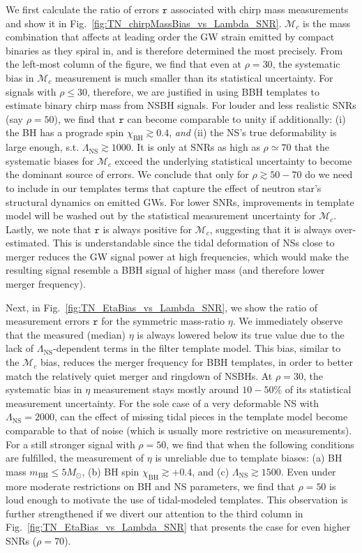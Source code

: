 \documentclass[aps,prd,amsmath,floats,floatfix, twocolumn,
superscriptaddress,nofootinbib,showpacs]{revtex4-1}
\newcommand{\lambdans}{\Lambda_\mathrm{NS}}
\newcommand{\chibh}{\chi_\mathrm{BH}}
\newcommand{\mbh}{m_\mathrm{BH}}
\newcommand{\mchirp}{\mathcal{M}_c}
\newcommand{\arr}{\mathtt{r}}
\begin{document}
We first calculate the ratio of errors $\arr$ associated with chirp mass measurements
and show it in
Fig.~\ref{fig:TN_chirpMassBias_vs_Lambda_SNR}. $\mchirp$ is the mass combination
that affects at leading order the GW strain emitted
by compact binaries as they spiral in, and is therefore determined the most
precisely. From the left-most column of the figure, we find that even at $\rho=30$, 
the systematic bias in $\mchirp$ measurement is much smaller than its statistical
uncertainty. For signals with $\rho\leq 30$, therefore, we are justified in using
BBH templates to estimate binary chirp mass from NSBH signals. For louder and less
realistic SNRs (say $\rho=50$), we find that $\arr$ can become comparable to unity
if additionally: (i) the BH has a prograde spin $\chibh\gtrsim 0.4$, {\it and} (ii)
the NS's true deformability is large enough, s.t. $\lambdans \gtrsim 1000$.
% 
It is only at SNRs as high as $\rho\simeq70$ that the systematic biases for $\mchirp$
exceed the underlying statistical uncertainty to become the dominant source of
errors.
% 
We conclude that only for $\rho\gtrsim 50-70$ do we need to include in our templates
terms that capture the effect of neutron star's structural dynamics on emitted GWs.
For lower SNRs, improvements in template model will be washed out by the statistical
measurement uncertainty for $\mchirp$.
% 
Lastly, we note that $\arr$ is always positive for $\mchirp$, suggesting that
it is always over-estimated.
This is understandable since the tidal deformation of NSs close to merger reduces
the GW signal power at high frequencies, which would make the resulting signal
resemble a BBH signal of higher mass (and therefore lower merger frequency).


Next, in Fig.~\ref{fig:TN_EtaBias_vs_Lambda_SNR}, we show the ratio of
measurement errors $\arr$ for the symmetric mass-ratio $\eta$. We immediately
observe that the measured (median) $\eta$ is always lowered below its true
value due to the lack of $\lambdans$-dependent terms in the filter template
model. This bias, similar to the $\mchirp$ bias, reduces the merger frequency
for BBH templates, in order to better match the relatively quiet merger and
ringdown of NSBHs. 
% 
At $\rho=30$, the systematic bias in $\eta$ measurement stays mostly around
$10-50\%$ of its statistical measurement uncertainty. For the sole case of a
very deformable NS with $\lambdans=2000$, can the effect of missing tidal pieces
in the template model become comparable to that of noise (which is usually
more restrictive on measurements).
% 
For a still stronger signal with $\rho=50$, we find that when the following
conditions are fulfilled, the measurement of $\eta$ is unreliable due to
template biases: (a) BH mass $\mbh\leq 5M_\odot$, (b) BH spin
$\chibh\gtrsim +0.4$, and (c) $\lambdans\gtrsim 1500$. Even under more
moderate restrictions on BH and NS parameters, we find that $\rho=50$ is 
loud enough to motivate the use of tidal-modeled templates. This observation
is further strengthened if we divert our attention to the third column in
Fig.~\ref{fig:TN_EtaBias_vs_Lambda_SNR} that presents
the case for even higher SNRs ($\rho=70$).
\end{document}

